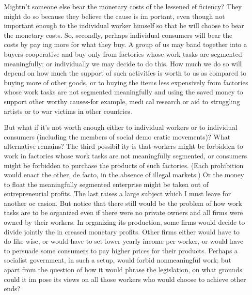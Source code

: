 \documentclass[11pt,openany]{book}
\begin{document}
Mightn't someone else bear the monetary costs of the lessened ef ficiency? They might do so because they believe the cause is im portant, even though not important enough to the individual worker himself so that he will choose to bear the monetary costs. So, secondly, perhaps individual consumers will bear the costs by pay ing more for what they buy. A group of us may band together into a buyers cooperative and buy only from factories whose work tasks are segmented meaningfully; or individually we may decide to do this. How much we do so will depend on how much the support of such activities is worth to us as compared to buying more of other goods, or to buying the items less expensively from factories whose work tasks are not segmented meaningfully and using the saved money to support other worthy causes-for example, medi cal research or aid to struggling artists or to war victims in other countries. 

But what if it's not worth enough either to individual workers or to individual consumers (including the members of social demo cratic movements)? What alternative remains? The third possibil ity is that workers might be forbidden to work in factories whose work tasks are not meaningfully segmented, or consumers might be forbidden to purchase the products of such factories. (Each prohibition would enact the other, de facto, in the absence of illegal markets.) Or the money to float the meaningfully segmented enterprise might be taken out of entrepreneurial profits. The last raises a large subject which I must leave for another oc casion. But notice that there still would be the problem of how work tasks are to be organized even if there were no private owners and all firms were owned by their workers. In organizing its production, some firms would decide to divide jointly the in creased monetary profits. Other firms either would have to do like wise, or would have to set lower yearly income per worker, or would have to persuade some consumers to pay higher prices for their products. Perhaps a socialist government, in such a setup, would forbid nonmeaningful work; but apart from the question of how it would phrase the legislation, on what grounds could it im pose its views on all those workers who would choose to achieve other ends? 
\end{document}
